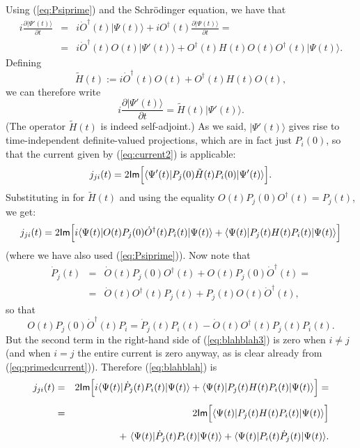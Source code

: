 \documentclass[12pt]{article}
\newcommand{\be}{\begin{equation}}
\newcommand{\ee}{\end{equation}}
\renewcommand{\Im}{\mbox{{\sf Im}}}                             %
\newcommand{\bra}[1]{\langle #1\vert}                           %
\newcommand{\ket}[1]{\vert #1\rangle}                           %
\begin{document}
Using (\ref{eq:Psiprime}) and the Schr\"odinger equation, we have that
\begin{eqnarray}
  {\displaystyle i \frac{\partial \ket{\Psi'(t)}}{\partial t} } & = &
  {\displaystyle
   i \dot{O}^{\dagger}(t) \ket{\Psi(t)} + i O^{\dagger}(t) 
   \frac{\partial \ket{\Psi(t)}}{\partial t}= } \nonumber  \\[1ex]
   \ & = &
  {\displaystyle  i \dot{O}^{\dagger}(t) O(t) \ket{\Psi'(t)} +
  O^{\dagger}(t) H(t) O(t) O^{\dagger}(t) \ket{\Psi(t)}.}
\end{eqnarray}
Defining
\be
  \tilde{H}(t) := i\dot{O}^{\dagger}(t) O(t) + O^{\dagger}(t) 
  H(t) O(t),
  \label{eq:effective}
\ee
we can therefore write
\be
  \label{eq:primedschr}
  i \frac{\partial \ket{\Psi'(t)}}{\partial t} = \tilde{H}(t) 
  \ket{\Psi'(t)}.
\ee
(The operator $\tilde{H}(t)$ is indeed self-adjoint.) As we said, 
$\ket{\Psi'(t)}$ gives rise to time-independent definite-valued 
projections, which are in fact just $P_i(0)$, so that the current 
given by (\ref{eq:current2}) is applicable:
\be
  \label{eq:primedcurrent}
  j_{ji}(t) = 2 \Im \Big[ \bra{\Psi'(t)} P_j(0) \tilde{H}(t) P_i(0)
  \ket{\Psi'(t)} \Big].
\ee
Substituting in for $\tilde{H}(t)$ and using the equality
$O(t)P_j(0)O^{\dagger}(t) = P_j(t)$, we get:
\be
  \label{eq:blahblah}
  j_{ji}(t) = 2 \Im \Big[ i\bra{\Psi(t)} O(t) P_j(0) 
  \dot{O}^{\dagger}(t) P_i(t) \ket{\Psi(t)} + \bra{\Psi(t)} P_j(t) 
  H(t) P_i(t) \ket{\Psi(t)} \Big]
\ee
(where we have also used (\ref{eq:Psiprime})).  Now note that
\begin{eqnarray}
  \dot{P}_j(t) & = & \dot{O}(t) P_j(0) O^{\dagger}(t) + O(t) P_j(0)
  \dot{O}^{\dagger}(t)= \nonumber \\[1ex]
  \ & = &
  \dot{O}(t)O^{\dagger}(t) P_j(t) + P_j(t) O(t) \dot{O}^{\dagger}(t),
  \label{eq:blahblah2}
\end{eqnarray}
so that
\be
  \label{eq:blahblah3}
  O(t)P_j(0) \dot{O}^{\dagger}(t)P_i = \dot{P}_j(t)P_i(t) -
  \dot{O}(t)O^{\dagger}(t)P_j(t)P_i(t).
\ee
But the second term in the right-hand side of (\ref{eq:blahblah3}) is
zero when $i \neq j$ (and when $i = j$ the entire current is zero
anyway, as is clear already from (\ref{eq:primedcurrent})). Therefore
(\ref{eq:blahblah}) is
\begin{eqnarray}
  j_{ji}(t) & = &
  2 \Im \Big[ i\bra{\Psi(t)} \dot{P}_j(t) P_i(t) \ket{\Psi(t)}
  + \bra{\Psi(t)} P_j(t) H(t) P_i(t) \ket{\Psi(t)} \Big]= \nonumber 
  \\[1ex] \ & = &
  2 \Im \Big[ \bra{\Psi(t)} P_j(t) H(t) P_i(t) \ket{\Psi(t)} \Big]
  \nonumber  \\[1ex]
  \ &  &  \ \ \
  + \ \bra{\Psi(t)}\dot{P}_j(t)P_i(t)\ket{\Psi(t)}
  + \bra{\Psi(t)}P_i(t)\dot{P}_j(t)\ket{\Psi(t)}.
  \label{eq:blahblah4}
\end{eqnarray}
\end{document}
